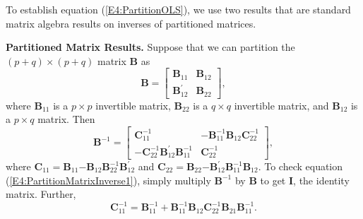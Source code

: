 To establish equation (\ref{E4:PartitionOLS}),
we use two results that are standard matrix algebra results on
inverses of partitioned matrices.

\textbf{Partitioned Matrix Results.} Suppose that we can partition
the $(p+q)\times (p+q)$ matrix $\mathbf{B}$ as
\begin{equation*}
\mathbf{B}=%
\begin{bmatrix}
\mathbf{B}_{11} & \mathbf{B}_{12} \\
\mathbf{B}_{12}^{\prime } & \mathbf{B}_{22}%
\end{bmatrix},
\end{equation*}
where $\mathbf{B}_{11}$ is a $p\times p$ invertible matrix,
$\mathbf{B}_{22}$ is a $q\times q$ invertible matrix, and
$\mathbf{B}_{12}$ is a $p\times q$ matrix. Then
\begin{equation}\label{E4:PartitionMatrixInverse1}
\mathbf{B}^{-1}=%
\begin{bmatrix}
\mathbf{C}_{11}^{-1} &
- \mathbf{B}_{11}^{-1}\mathbf{B}_{12}\mathbf{C}_{22}^{-1} \\
- \mathbf{C}_{22}^{-1} \mathbf{B}_{12}^{\prime} \mathbf{B}_{11}^{-1}
& \mathbf{C}_{22}^{-1}
\end{bmatrix},
\end{equation}
where
$\mathbf{C}_{11}=\mathbf{B}_{11}\mathbf{-B}_{12}\mathbf{B}_{22}^{-1}
\mathbf{B}_{12}^{\prime }$ and
$\mathbf{C}_{22}=\mathbf{B}_{22}\mathbf{-B}_{12}^{\prime
}\mathbf{B}_{11}^{-1}\mathbf{B}_{12}$. To check equation
(\ref{E4:PartitionMatrixInverse1}), simply multiply
$\mathbf{B}^{-1}$ by $\mathbf{B}$ to get $\mathbf{I}$, the identity
matrix. Further,
\begin{equation}\label{E4:PartitionMatrixInverse2}
\mathbf{C}_{11}^{-1}  = \mathbf{B}_{11}^{-1} + \mathbf{B}_{11}^{-1}
\mathbf{B}_{12} \mathbf{C}_{22}^{-1} \mathbf{B}_{21}
\mathbf{B}_{11}^{-1}.
\end{equation}

